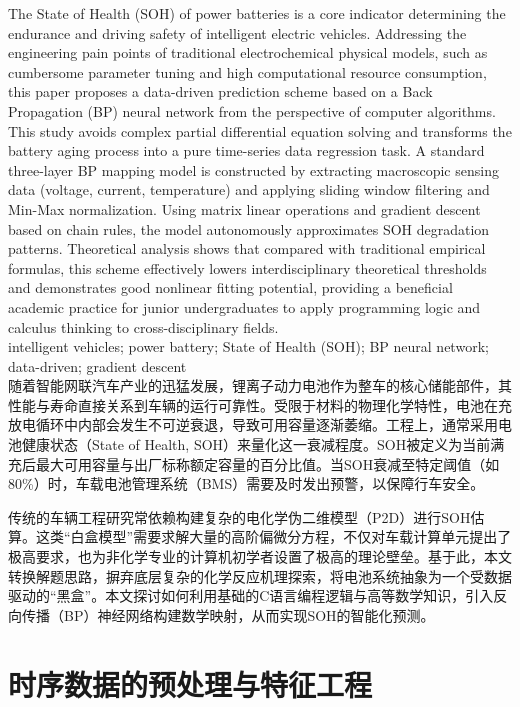 \documentclass[a4paper,10.5pt]{article}
\begin{document}
 { The State of Health (SOH) of power batteries is a core indicator determining the endurance and driving safety of intelligent electric vehicles. Addressing the engineering pain points of traditional electrochemical physical models, such as cumbersome parameter tuning and high computational resource consumption, this paper proposes a data-driven prediction scheme based on a Back Propagation (BP) neural network from the perspective of computer algorithms. This study avoids complex partial differential equation solving and transforms the battery aging process into a pure time-series data regression task. A standard three-layer BP mapping model is constructed by extracting macroscopic sensing data (voltage, current, temperature) and applying sliding window filtering and Min-Max normalization. Using matrix linear operations and gradient descent based on chain rules, the model autonomously approximates SOH degradation patterns. Theoretical analysis shows that compared with traditional empirical formulas, this scheme effectively lowers interdisciplinary theoretical thresholds and demonstrates good nonlinear fitting potential, providing a beneficial academic practice for junior undergraduates to apply programming logic and calculus thinking to cross-disciplinary fields.}\\[5pt]
 { intelligent vehicles; power battery; State of Health (SOH); BP neural network; data-driven; gradient descent}\\[20pt]

随着智能网联汽车产业的迅猛发展，锂离子动力电池作为整车的核心储能部件，其性能与寿命直接关系到车辆的运行可靠性。受限于材料的物理化学特性，电池在充放电循环中内部会发生不可逆衰退，导致可用容量逐渐萎缩。工程上，通常采用电池健康状态（State of Health, SOH）来量化这一衰减程度。SOH被定义为当前满充后最大可用容量与出厂标称额定容量的百分比值。当SOH衰减至特定阈值（如80\%）时，车载电池管理系统（BMS）需要及时发出预警，以保障行车安全。

传统的车辆工程研究常依赖构建复杂的电化学伪二维模型（P2D）进行SOH估算。这类“白盒模型”需要求解大量的高阶偏微分方程，不仅对车载计算单元提出了极高要求，也为非化学专业的计算机初学者设置了极高的理论壁垒。基于此，本文转换解题思路，摒弃底层复杂的化学反应机理探索，将电池系统抽象为一个受数据驱动的“黑盒”。本文探讨如何利用基础的C语言编程逻辑与高等数学知识，引入反向传播（BP）神经网络构建数学映射，从而实现SOH的智能化预测。

\section{时序数据的预处理与特征工程}
\end{document}

